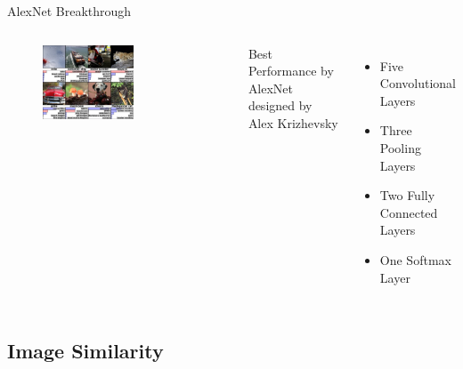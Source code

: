 \documentclass{beamer}
\begin{document}
  \begin{frame}{AlexNet Breakthrough}

    \begin{columns}[c]


        \begin{figure}
          \par\medskip
          \includegraphics[width=0.6\textwidth]{images/slides/imagenet.jpg}
        \end{figure}


        \begin{center}
          Best Performance by AlexNet designed by Alex Krizhevsky
        \end{center}
        \begin{itemize}
          \item Five Convolutional Layers
          \item Three Pooling Layers
          \item Two Fully Connected Layers
          \item One Softmax Layer
        \end{itemize}

      \end{columns}

  \end{frame}

  \subsection{Image Similarity}
\end{document}

